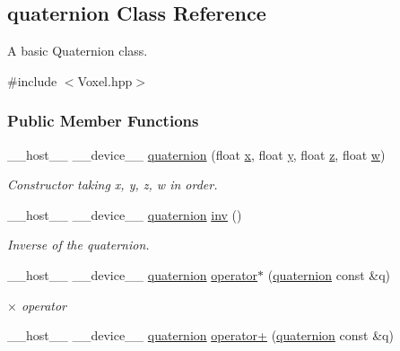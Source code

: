 \hypertarget{classquaternion}{}\subsection{quaternion Class Reference}
\label{classquaternion}


A basic Quaternion class.  




{\ttfamily \#include $<$Voxel.\+hpp$>$}

\subsubsection*{Public Member Functions}
\begin{DoxyCompactItemize}
\item 
\+\_\+\+\_\+host\+\_\+\+\_\+ \+\_\+\+\_\+device\+\_\+\+\_\+ \hyperlink{classquaternion_a01adb7930c2003b777cb91a7182c482e}{quaternion} (float \hyperlink{classquaternion_acdcda48f9dd7ff35873aae38fa33ab78}{x}, float \hyperlink{classquaternion_a48e3d1fbf5e12eb54985c32b45dd8303}{y}, float \hyperlink{classquaternion_a538598007238d399f79ddcecd39ef5cf}{z}, float \hyperlink{classquaternion_ab2b38aca1971114e0ba4218b75d7f472}{w})
\begin{DoxyCompactList}\small\item\em Constructor taking x, y, z, w in order. \end{DoxyCompactList}\item 
\+\_\+\+\_\+host\+\_\+\+\_\+ \+\_\+\+\_\+device\+\_\+\+\_\+ \hyperlink{classquaternion}{quaternion} \hyperlink{classquaternion_a5f2dff4e0f446d05e826a63d5a45d230}{inv} ()
\begin{DoxyCompactList}\small\item\em Inverse of the quaternion. \end{DoxyCompactList}\item 
\+\_\+\+\_\+host\+\_\+\+\_\+ \+\_\+\+\_\+device\+\_\+\+\_\+ \hyperlink{classquaternion}{quaternion} \hyperlink{classquaternion_a63777bf9c0c0a269852808442c2be4f5}{operator$\ast$} (\hyperlink{classquaternion}{quaternion} const \&q)
\begin{DoxyCompactList}\small\item\em $\times$ operator \end{DoxyCompactList}\item 
\+\_\+\+\_\+host\+\_\+\+\_\+ \+\_\+\+\_\+device\+\_\+\+\_\+ \hyperlink{classquaternion}{quaternion} \hyperlink{classquaternion_ae2cf533c781610bf66bf39c30bd6b6ec}{operator+} (\hyperlink{classquaternion}{quaternion} const \&q)

\end{DoxyCompactItemize}
